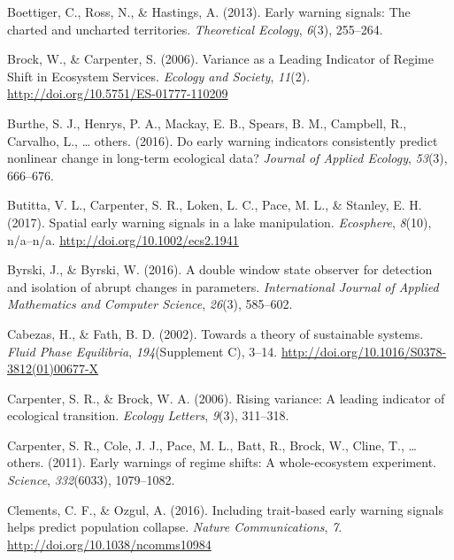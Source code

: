 \documentclass[12pt,twoside,openany]{reedthesis}
\begin{document}
\leavevmode\hypertarget{ref-boettiger_early_2013}{}%
Boettiger, C., Ross, N., \& Hastings, A. (2013). Early warning signals: The charted and uncharted territories. \emph{Theoretical Ecology}, \emph{6}(3), 255--264.

\leavevmode\hypertarget{ref-brock_variance_2006}{}%
Brock, W., \& Carpenter, S. (2006). Variance as a Leading Indicator of Regime Shift in Ecosystem Services. \emph{Ecology and Society}, \emph{11}(2). \url{http://doi.org/10.5751/ES-01777-110209}

\leavevmode\hypertarget{ref-burthe2016early}{}%
Burthe, S. J., Henrys, P. A., Mackay, E. B., Spears, B. M., Campbell, R., Carvalho, L., \ldots{} others. (2016). Do early warning indicators consistently predict nonlinear change in long-term ecological data? \emph{Journal of Applied Ecology}, \emph{53}(3), 666--676.

\leavevmode\hypertarget{ref-butitta_spatial_2017}{}%
Butitta, V. L., Carpenter, S. R., Loken, L. C., Pace, M. L., \& Stanley, E. H. (2017). Spatial early warning signals in a lake manipulation. \emph{Ecosphere}, \emph{8}(10), n/a--n/a. \url{http://doi.org/10.1002/ecs2.1941}

\leavevmode\hypertarget{ref-byrski2016double}{}%
Byrski, J., \& Byrski, W. (2016). A double window state observer for detection and isolation of abrupt changes in parameters. \emph{International Journal of Applied Mathematics and Computer Science}, \emph{26}(3), 585--602.

\leavevmode\hypertarget{ref-cabezas_towards_2002}{}%
Cabezas, H., \& Fath, B. D. (2002). Towards a theory of sustainable systems. \emph{Fluid Phase Equilibria}, \emph{194}(Supplement C), 3--14. \url{http://doi.org/10.1016/S0378-3812(01)00677-X}

\leavevmode\hypertarget{ref-carpenter2006rising}{}%
Carpenter, S. R., \& Brock, W. A. (2006). Rising variance: A leading indicator of ecological transition. \emph{Ecology Letters}, \emph{9}(3), 311--318.

\leavevmode\hypertarget{ref-carpenter2011early}{}%
Carpenter, S. R., Cole, J. J., Pace, M. L., Batt, R., Brock, W., Cline, T., \ldots{} others. (2011). Early warnings of regime shifts: A whole-ecosystem experiment. \emph{Science}, \emph{332}(6033), 1079--1082.

\leavevmode\hypertarget{ref-clements_including_2016}{}%
Clements, C. F., \& Ozgul, A. (2016). Including trait-based early warning signals helps predict population collapse. \emph{Nature Communications}, \emph{7}. \url{http://doi.org/10.1038/ncomms10984}
\end{document}
